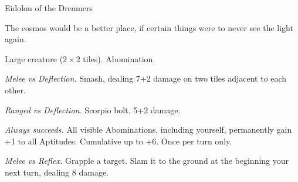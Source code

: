 \begin{monsterboxbg}{Eidolon of the Dreamers}

    The cosmos would be a better place, if certain things were to never see the light again.
    
    \rpghline
    \stats[
        STR = \stat{16}, 
        DEX = \stat{14},
        CON = \stat{22},
        INT = \stat{10},
        WIS = \stat{10},
        CHA = \stat{12},
    ]
    \rpghline

    \basics[
    armorclass = 0,
    hitpoints  = 200,
    focus      = 12,
    defenses   = {Deflection 1, Reflex 1, Fortitude 9, Will 2}
    ]
    \rpghline

    \details[%
    skills = {Athletics 2},
    accuracies = {Melee 4, Ranged 0},
    challenge = Boss,
    ]
    \rpghline%
    \begin{rpg-monsteraction}
        Large creature ($2 \times 2$ tiles). Abomination.
    \end{rpg-monsteraction}

    

    \begin{rpg-monsteraction}
        \textit{Melee vs Deflection.} Smash, dealing 7+2 damage on two tiles adjacent to each other.
    \end{rpg-monsteraction}

    \begin{rpg-monsteraction}
        \textit{Ranged vs Deflection.} Scorpio bolt. 5+2 damage.
    \end{rpg-monsteraction}

    \begin{rpg-monsteraction}
    \end{rpg-monsteraction}

    \begin{rpg-monsteraction}
        \textit{Always succeeds.} All visible Abominations, including yourself, permanently gain +1 to all Aptitudes. Cumulative up to +6. Once per turn only.
    \end{rpg-monsteraction}

    \begin{rpg-monsteraction}
        \textit{Melee vs Reflex.} Grapple a target. Slam it to the ground at the beginning your next turn, dealing 8 damage.
    \end{rpg-monsteraction}


\end{monsterboxbg}
